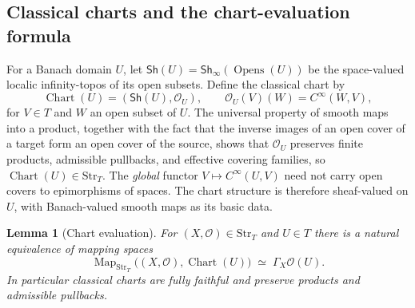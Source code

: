 \documentclass[12pt]{amsart}
\newtheorem{lem}[thm]{Lemma}
\theoremstyle{definition}
\theoremstyle{remark}
\numberwithin{equation}{section}
\newcommand{\Sh}{\mathsf{Sh}}
\DeclareMathOperator{\Map}{Map}
\begin{document}
\subsection{Classical charts and the chart-evaluation formula}
\label{subsec:banach-charts}

For a Banach domain $U$, let
$\Sh(U)=\Sh_\infty(\operatorname{Opens}(U))$ be the
space-valued localic infinity-topos of its open subsets.
Define the classical chart by
\begin{equation}
\label{eq:banach-chart}
 \operatorname{Chart}(U)=(\Sh(U),\mathcal O_U),
 \qquad
 \mathcal O_U(V)(W)=C^{\infty}(W,V),
\end{equation}
for $V\in T$ and $W$ an open subset of $U$. The universal property
of smooth maps into a product, together with the fact that the
inverse images of an open cover of a target form an open cover
of the source, shows that $\mathcal O_U$ preserves finite
products, admissible pullbacks, and effective covering families, so
$\operatorname{Chart}(U)\in\mathrm{Str}_T$. The \emph{global} functor
$V\mapsto C^{\infty}(U,V)$ need not carry open covers to
epimorphisms of spaces. The chart structure is therefore
sheaf-valued on $U$, with Banach-valued smooth maps as its
basic data.

\begin{lem}[Chart evaluation]
\label{lem:banach-chart-eval}
For $(X,\mathcal O)\in\mathrm{Str}_T$ and $U\in T$ there is a
natural equivalence of mapping spaces
\begin{equation}
\label{eq:banach-chart-eval}
 \Map_{\mathrm{Str}_T}\!\bigl((X,\mathcal O),\operatorname{Chart}(U)\bigr)
 \;\simeq\;
 \Gamma_X\mathcal O(U).
\end{equation}
In particular classical charts are fully faithful and preserve
products and admissible pullbacks.
\end{lem}
\end{document}
